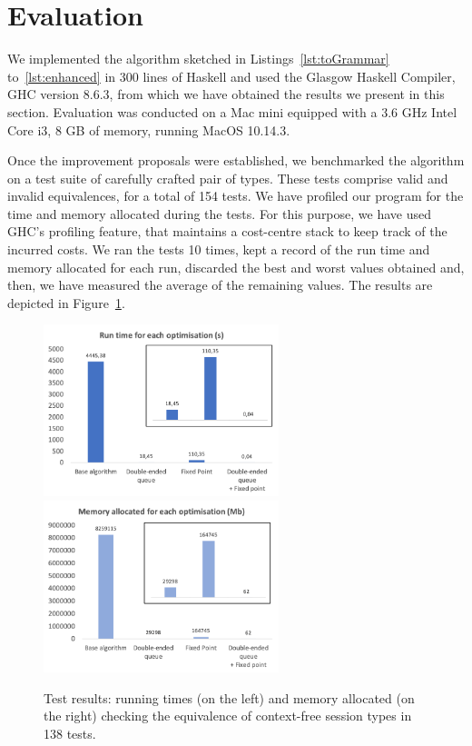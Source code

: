 \section{Evaluation}
\label{sec:evaluation}


We implemented the algorithm sketched in Listings~\ref{lst:toGrammar}
to~\ref{lst:enhanced} in 300 lines of Haskell and used the Glasgow
Haskell Compiler, GHC version 8.6.3, from which we have obtained the
results we present in this section.  Evaluation was conducted on a Mac
mini equipped with a 3.6 GHz Intel Core i3, 8 GB of memory, running
MacOS 10.14.3.

Once the improvement proposals were established, we benchmarked the
algorithm on a test suite of carefully crafted pair of types. These
tests comprise valid and invalid equivalences, for a total of 154
tests. We have profiled our program for the time and memory allocated
during the tests. For this purpose, we have used GHC's profiling
feature, that maintains a cost-centre stack to keep track of the
incurred costs. We ran the tests 10 times, kept a record of the run
time and memory allocated for each run, discarded the best and worst
values obtained and, then, we have measured the average of the
remaining values. The results are depicted in
Figure~\ref{fig:results}.

\begin{figure}[h]
	\includegraphics[height=5cm]{img/run_time}	\enspace
	\includegraphics[height=5cm]{img/memory_alloc}
	\caption{Test results: running times (on the left) and
	memory allocated (on the right) checking the equivalence
	of context-free session types in 138 tests.}
	\label{fig:results}
\end{figure}

